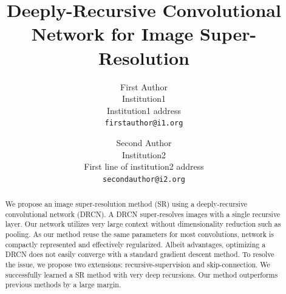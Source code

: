 \documentclass[10pt,twocolumn,letterpaper]{article}
\begin{document}


\title{Deeply-Recursive Convolutional Network for Image Super-Resolution}

\author{First Author\\
	Institution1\\
	Institution1 address\\
	{\tt\small firstauthor@i1.org}
	\and
	Second Author\\
	Institution2\\
	First line of institution2 address\\
	{\tt\small secondauthor@i2.org}
}

\maketitle



\begin{abstract}
We propose an image super-resolution method (SR) using a deeply-recursive convolutional network (DRCN). A DRCN super-resolves images with a single recursive layer. Our network utilizes very large context without dimensionality reduction such as pooling. As our method reuse the same parameters for most convolutions, network is compactly represented and effectively regularized. Albeit advantages, optimizing a DRCN does not easily converge with a standard gradient descent method. To resolve the issue, we propose two extensions: recursive-supervision and skip-connection. We successfully learned a SR method with very deep recursions. Our method outperforms previous methods by a large margin.
\end{abstract}
\end{document}
